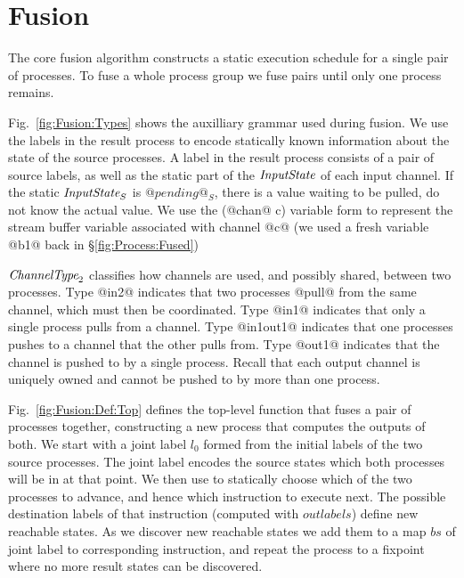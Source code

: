 
\section{Fusion}
\label{s:Fusion}

The core fusion algorithm constructs a static execution schedule for a single pair of processes. To fuse a whole process group we fuse pairs until only one process remains.

Fig.~\ref{fig:Fusion:Types} shows the auxilliary grammar used during fusion. We use the labels in the result process to encode statically known information about the state of the source processes. A label in the result process consists of a pair of source labels, as well as the static part of the $\textit{InputState}$ of each input channel. If the static $\textit{InputState}_S$ is $@pending@_S$, there is a value waiting to be pulled, do not know the actual value. We use the (@chan@ c) variable form to represent the stream buffer variable associated with channel @c@ (we used a fresh variable @b1@ back in \S\ref{fig:Process:Fused})

$\textit{ChannelType}_2$ classifies how channels are used, and possibly shared, between two processes. Type @in2@ indicates that two processes @pull@ from the same channel, which must then be coordinated. Type @in1@ indicates that only a single process pulls from a channel. Type @in1out1@ indicates that one processes pushes to a channel that the other pulls from. Type @out1@ indicates that the channel is pushed to by a single process. Recall that each output channel is uniquely owned and cannot be pushed to by more than one process.




Fig.~\ref{fig:Fusion:Def:Top} defines the top-level function  that fuses a pair of processes together, constructing a new process that computes the outputs of both. We start with a joint label $l_0$ formed from the initial labels of the two source processes. The joint label encodes the source states which both processes will be in at that point. We then use  to statically choose which of the two processes to advance, and hence which instruction to execute next. The possible destination labels of that instruction (computed with $outlabels$) define new reachable states. As we discover new reachable states we add them to a map $bs$ of joint label to corresponding instruction, and repeat the process to a fixpoint where no more result states can be discovered.

